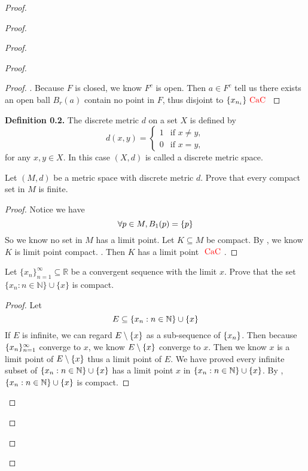 \documentclass{report}
\begin{document}
\begin{proof}
\begin{proof}
\begin{proof}
\begin{proof}
\begin{proof}
. Because $F$ is closed, we know  $F^c$ is open. Then  $a\in F^c$ tell us there exists an open ball $B_r(a)$ contain no point in $F$, thus disjoint to  $\{ x_{n_i} \}\text{ \textcolor{red}{CaC} }$

\end{proof}
\textbf{Definition 0.2.} The discrete metric \( d \) on a set \( X \) is defined by
\[
d(x,y) = 
\begin{cases} 
1 & \text{if } x \neq y, \\
0 & \text{if } x = y,
\end{cases}
\]
for any \( x, y \in X \). In this case \( (X,d) \) is called a discrete metric space.
\begin{question}{}{}

Let \( (M, d) \) be a metric space with discrete metric \( d \). Prove that every compact set in \( M \) is finite.
\end{question}
\begin{proof}
Notice we have
\begin{equation}
\forall p\in M, B_1(p)=\{ p \}
\end{equation}
So we know no set in $M$ has a limit point. Let $K\subseteq M$ be compact. By , we know $K$ is limit point compact. . Then $K$ has a limit point  $\text{ \textcolor{red}{CaC} }$.
\end{proof}
\begin{question}{}{}

Let \( \{ x_n \}_{n=1}^{\infty} \subseteq \mathbb{R} \) be a convergent sequence with the limit \( x \). Prove that the set \( \{ x_n : n \in \mathbb{N} \} \cup \{ x \} \) is compact.
\end{question}
\begin{proof}
Let 
\begin{equation}
E\subseteq \{ x_n:n\in\mathbb{N} \}\cup \{ x \}
\end{equation}
If $E$ is infinite, we can regard  $E\setminus \{ x \}$ as a sub-sequence of $\{ x_n \}$. Then because $\{ x_n \}_{n=1}^\infty$ converge to $x$, we know  $E\setminus \{ x \}$ converge to $x$. Then we know $x$ is a limit point of $E\setminus \{ x \}$ thus a limit point of $E$. We have proved every infinite subset of $\{ x_n:n\in\mathbb{N} \}\cup \{ x \}$ has a limit point $x$ in $\{ x_n:n\in\mathbb{N} \}\cup \{ x \}$. By , $\{ x_n:n\in\mathbb{N} \}\cup \{ x \}$ is compact.
\end{proof}
\begin{question}{}{}


\end{question}
\end{proof}
\end{proof}
\end{proof}
\end{proof}
\end{document}
